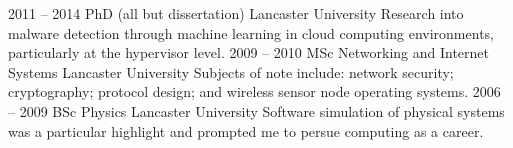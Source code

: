 \documentclass[9pt]{developercv} %
\begin{document}
\begin{entrylist}
	\entry
		{2011 -- 2014}
		{PhD (all but dissertation)}
		{Lancaster University}
		{Research into malware detection through machine learning in cloud computing environments, particularly at the hypervisor level.}
	\entry
		{2009 -- 2010}
		{MSc Networking and Internet Systems}
		{Lancaster University}
		{Subjects of note include: network security; cryptography; protocol design; and wireless sensor node operating systems.}
	\entry
		{2006 -- 2009}
		{BSc Physics}
		{Lancaster University}
		{Software simulation of physical systems was a particular highlight and prompted me to persue computing as a career.}
\end{entrylist}



	
	
	
	
	

\end{document}
